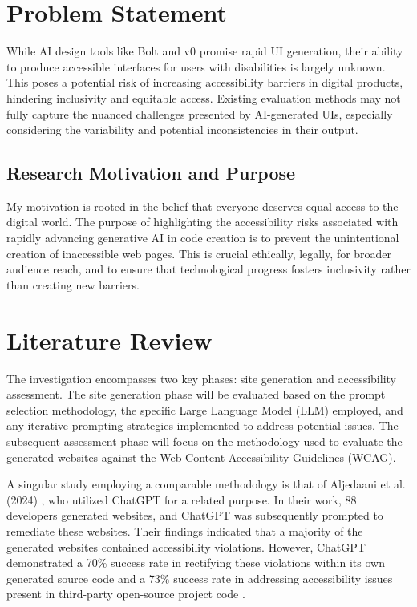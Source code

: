 \documentclass{article}
\begin{document}
\printacronyms[display=all,heading=section]

\section{Problem Statement}
While AI design tools like Bolt and v0 promise rapid UI generation, their ability to produce accessible interfaces for users with disabilities is largely unknown. This poses a potential risk of increasing accessibility barriers in digital products, hindering inclusivity and equitable access. Existing evaluation methods may not fully capture the nuanced challenges presented by AI-generated UIs, especially considering the variability and potential inconsistencies in their output.

\subsection{Research Motivation and Purpose}

My motivation is rooted in the belief that everyone deserves equal access to the digital world. The purpose of highlighting the accessibility risks associated with rapidly advancing generative AI in code creation is to prevent the unintentional creation of inaccessible web pages. This is crucial ethically, legally, for broader audience reach, and to ensure that technological progress fosters inclusivity rather than creating new barriers.

\section{Literature Review}
The investigation encompasses two key phases: site generation and accessibility assessment. The site generation phase will be evaluated based on the prompt selection methodology, the specific Large Language Model (LLM) employed, and any iterative prompting strategies implemented to address potential issues. The subsequent assessment phase will focus on the methodology used to evaluate the generated websites against the Web Content Accessibility Guidelines (WCAG).

A singular study employing a comparable methodology is that of Aljedaani et al. (2024) \cite{aljedaani_does_2024}, who utilized ChatGPT for a related purpose. In their work, 88 developers generated websites, and ChatGPT was subsequently prompted to remediate these websites. Their findings indicated that a majority of the generated websites contained accessibility violations. However, ChatGPT demonstrated a 70\% success rate in rectifying these violations within its own generated source code and a 73\% success rate in addressing accessibility issues present in third-party open-source project code \cite{aljedaani_does_2024}.
\end{document}
